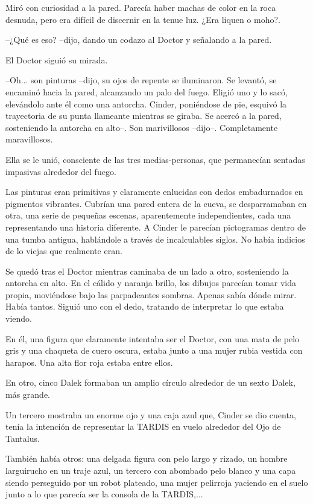 Miró con curiosidad a la pared. Parecía haber machas de color en la roca desnuda, pero era difícil de discernir en la tenue luz. ¿Era liquen o moho?.



--¿Qué es eso? --dijo, dando un codazo al Doctor y señalando a la pared.



El Doctor siguió su mirada. 



--Oh... son pinturas --dijo, su ojos de repente se iluminaron. Se levantó, se encaminó hacia la pared, alcanzando un palo del fuego. Eligió uno y lo sacó, elevándolo ante él como una antorcha. Cinder, poniéndose de pie, esquivó la trayectoria de su punta llameante mientras se giraba. Se acercó a la pared, sosteniendo la antorcha en alto--. Son marivillosos --dijo--. Completamente maravillosos.



Ella se le unió, consciente de las tres medias-personas, que permanecían sentadas impasivas alrededor del fuego.

Las pinturas eran primitivas y claramente enlucidas con dedos embadurnados en pigmentos vibrantes. Cubrían una pared entera de la cueva, se desparramaban en otra, una serie de pequeñas escenas, aparentemente independientes, cada una representando una historia diferente. A Cinder le parecían pictogramas dentro de una tumba antigua, hablándole a través de incalculables siglos. No había indicios de lo viejas que realmente eran.

Se quedó tras el Doctor mientras caminaba de un lado a otro, sosteniendo la antorcha en alto. En el cálido y naranja brillo, los dibujos parecían tomar vida propia, moviéndose bajo las parpadeantes sombras. Apenas sabía dónde mirar. Había tantos. Siguió uno con el dedo, tratando de interpretar lo que estaba viendo.

En él, una figura que claramente intentaba ser el Doctor, con una mata de pelo gris y una chaqueta de cuero oscura, estaba junto a una mujer rubia vestida con harapos. Una alta flor roja estaba entre ellos.

En otro, cinco Dalek formaban un amplio círculo alrededor de un sexto Dalek, más grande.

Un tercero mostraba un enorme ojo y una caja azul que, Cinder se dio cuenta, tenía la intención de representar la TARDIS en vuelo alrededor del Ojo de Tantalus.

También había otros: una delgada figura con pelo largo y rizado, un hombre larguirucho en un traje azul, un tercero con abombado pelo blanco y una capa siendo perseguido por un robot plateado, una mujer pelirroja yaciendo en el suelo junto a lo que parecía ser la consola de la TARDIS,...

